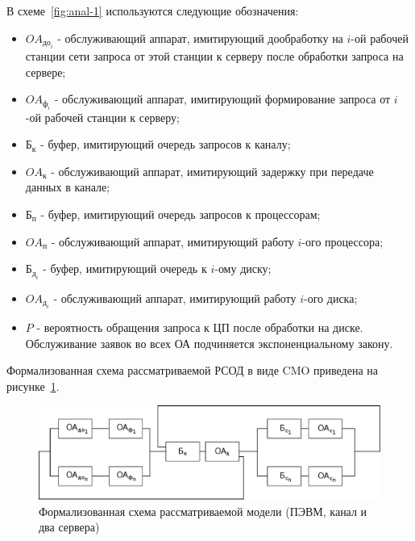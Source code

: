 \documentclass[russian,utf8,emptystyle]{eskdtext}
\begin{document}
В схеме~\ref{fig:anal-1} используются следующие обозначения:
\begin{itemize}[label=-]
\item $OA_{\text{до}_i}$ - обслуживающий аппарат, имитирующий дообработку на $i$-ой рабочей станции сети запроса от этой станции к серверу после обработки запроса на сервере;
\item $OA_{\text{ф}_i}$ - обслуживающий аппарат, имитирующий формирование запроса от $i$-ой рабочей станции к серверу;
\item $\text{Б}_\text{к}$ - буфер, имитирующий очередь запросов к каналу;
\item $OA_\text{к}$ - обслуживающий аппарат, имитирующий задержку при передаче данных в канале;
\item $\text{Б}_\text{п}$ - буфер, имитирующий очередь запросов к процессорам;
\item $OA_\text{п}$ - обслуживающий аппарат, имитирующий работу $i$-ого процессора;
\item $\text{Б}_{\text{д}_i}$ - буфер, имитирующий очередь к $i$-ому диску;
\item $OA_{\text{д}_i}$ - обслуживающий аппарат, имитирующий работу $i$-ого диска;
\item $P$ - вероятность обращения запроса к ЦП после обработки на диске. Обслуживание заявок во всех ОА подчиняется экспоненциальному закону.
\end{itemize}

Формализованная схема рассматриваемой РСОД в виде CMO приведена на рисунке~\ref{fig:anal-2}.
\begin{figure}[h!]
\centering
\includegraphics[width=1.0\textwidth]{anal2}
\caption{Формализованная схема рассматриваемой модели (ПЭВМ, канал и два сервера)}
\label{fig:anal-2}
\end{figure}
\end{document}
